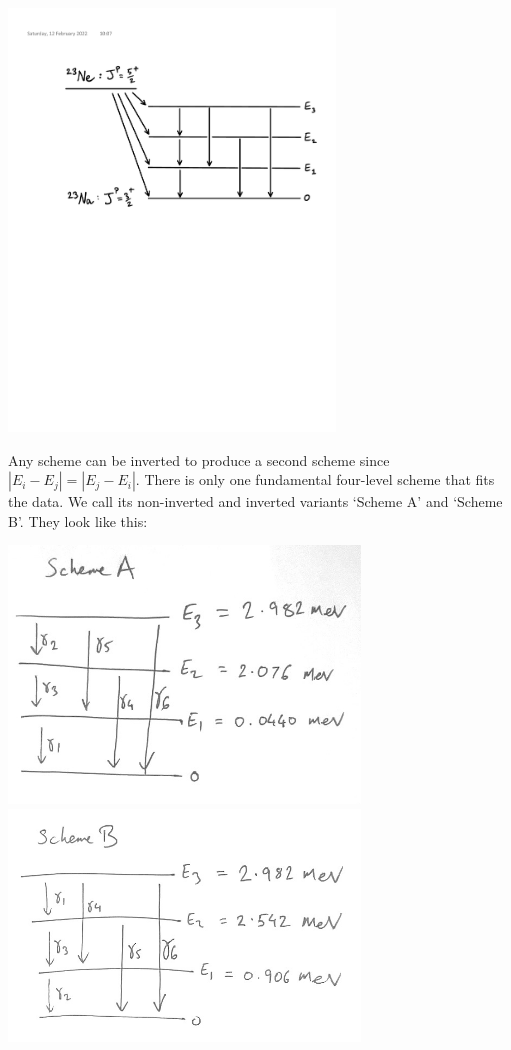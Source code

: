 \documentclass[txfonts]{NSTexam}
\newcommand\ANS[1]{{

\answer %


{\color{blue}
#1
}
 
\endanswer

}}
\begin{document}
\begin{questions}
\begin{allparts}
\begin{center}\includegraphics[width=0.65\textwidth]{Images/23Na_energy_levels_ipad.pdf}\end{center}

\ANS{

Any scheme can be inverted to produce a second scheme since $|E_i-E_j| = |E_j-E_i|$. There is only one fundamental four-level scheme that fits the data. We call its non-inverted and inverted variants `Scheme A' and `Scheme B'.  They look like this:


\includegraphics[width=0.7\textwidth]{Images/Scheme_A.jpeg}
\includegraphics[width=0.7\textwidth]{Images/Scheme_B.jpeg}

}
\end{allparts}
\end{questions}
\end{document}
